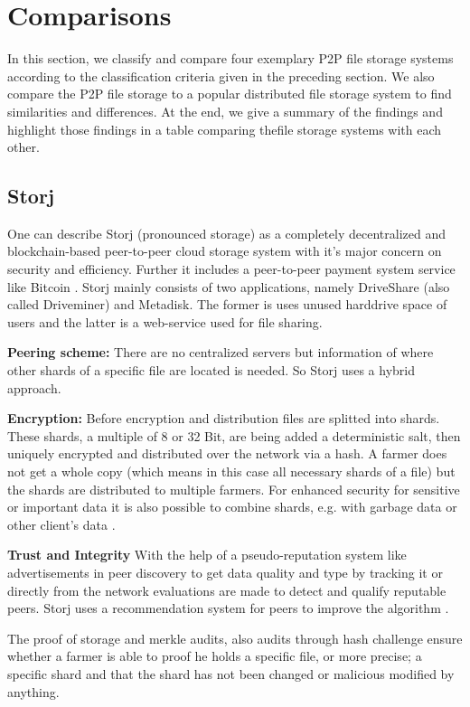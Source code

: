 \section{Comparisons}
In this section, we classify and compare four exemplary P2P file storage systems according to the classification criteria given in the preceding section. We also compare the P2P file storage to a popular distributed file storage system to find similarities and differences. At the end, we give a summary of the findings and highlight those findings in a table comparing thefile storage systems with each other.

\subsection{Storj} %
One can describe Storj (pronounced storage) as a completely decentralized and blockchain-based peer-to-peer cloud storage system with it's major concern on security and efficiency. Further it includes a peer-to-peer payment system service like Bitcoin \cite{storj:blog:what_is_storj}. Storj mainly consists of two applications, namely DriveShare (also called Driveminer)
and Metadisk. The former is uses unused harddrive space of users and the latter is a web-service used for file sharing.

\textbf{Peering scheme:} There are no centralized servers but information of where other shards of a specific file are located is needed. So Storj uses a hybrid approach.

\textbf{Encryption:} Before encryption and distribution files are splitted into shards. These shards, a multiple of 8 or 32 Bit, are being added a deterministic salt, then uniquely encrypted and distributed over the network via a hash. A farmer does not get a whole copy (which means in this case all necessary shards of a file) but the shards are distributed to multiple farmers. For enhanced security for sensitive or important data it is also possible to combine shards, e.g. with garbage data or other client's data  \cite{storj:PDF}.

\textbf{Trust and Integrity} With the help of a pseudo-reputation system like advertisements in peer discovery to get data quality and type by tracking it or directly from the network evaluations are made to detect and qualify reputable peers. Storj uses a recommendation system for peers to improve the algorithm \cite{storj:PDF}.

The proof of storage and merkle audits, also audits through hash challenge ensure whether a farmer is able to proof he holds a specific file, or more precise; a specific shard and that the shard has not been changed or malicious modified by anything.

